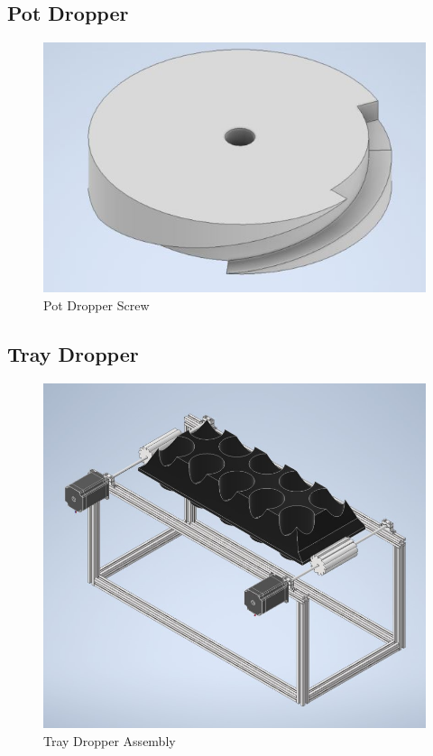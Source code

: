 \documentclass[12pt, titlepage]{article}
\begin{document}
\subsection{Pot Dropper}
\begin{figure}[H]
  \centering
  \includegraphics{Pot_Dropper.jpg}
  \caption{Pot Dropper Screw}
  \label{fig:potdropper1}
\end{figure}

\subsection{Tray Dropper}
\begin{figure}[H]
  \centering
  \includegraphics{Tray_Dropper_Asm.jpg}
  \caption{Tray Dropper Assembly}
  \label{fig:traydropper1}
\end{figure}
\end{document}
